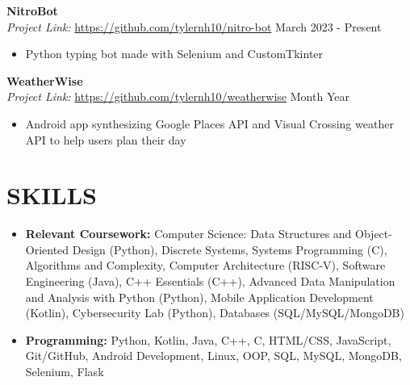 \documentclass[a4paper,10pt]{extarticle}
\begin{document}
\noindent
\textbf{NitroBot}\\ %
\textit{Project Link:} \url{https://github.com/tylernh10/nitro-bot} \hfill March 2023 - Present %
\begin{itemize}[topsep=3pt]
    \item Python typing bot made with Selenium and CustomTkinter %
\end{itemize}

\noindent
\textbf{WeatherWise}\\ %
\textit{Project Link:} \url{https://github.com/tylernh10/weatherwise} \hfill Month Year %
\begin{itemize}[topsep=3pt]
    \item Android app synthesizing Google Places API and Visual Crossing weather API to help users plan their day %
\end{itemize}

\section*{SKILLS}
\begin{itemize}
    \item \textbf{Relevant Coursework:} Computer Science: Data Structures and Object-Oriented Design (Python), Discrete Systems, Systems Programming (C), Algorithms and Complexity, Computer Architecture (RISC-V), Software Engineering (Java), C++ Essentials (C++), Advanced Data Manipulation and Analysis with Python (Python), Mobile Application Development (Kotlin), Cybersecurity Lab (Python), Databases (SQL/MySQL/MongoDB) %
    \item \textbf{Programming:} Python, Kotlin, Java, C++, C, HTML/CSS, JavaScript, Git/GitHub, Android Development, Linux, OOP, SQL, MySQL, MongoDB, Selenium, Flask %
\end{itemize}

\end{document}
